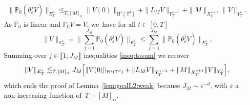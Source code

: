 \documentclass[10pt]{amsart}
\theoremstyle{definition}
\newcommand\T{\mathbb{T}}
\renewcommand\H{\mathrm{H}}
\let\ep\varepsilon
\begin{document}
\begin{align}\label{ineq:tosum}
\| \mathbb{P}_0(\theta_\ep^j V)\|_{E_T^s} \lesssim_{T,[M]_\alpha} \|V(0)\|_{\H^s(\T^d)} + \|L_M V\|_{Y_T^{s-1}} + \|M\|_{X_T^{s+1}}\|V\|_{Y_T^s}.
\end{align}
As $\mathbb{P}_0$ is linear and $\mathbb{P}_0 V = V$, we~have for all $t\in[0,T]$
\[
\|V\|_{E_T^s} = \biggl\|\sum_{j=1}^{J_M} \mathbb{P}_0(\theta_\ep^j V)\biggr\|_{E^s_T} \leq \sum_{j=1}^{J_M} \|\mathbb{P}_0(\theta_\ep^j V)\|_{E_T^s}.
\]
Summing over $j\in\llbracket 1,J_M\rrbracket$ inequalities \eqref{ineq:tosum} we recover
\[
\|V\|_{E_T^s} \lesssim_{T,[M]_\alpha} J_M \Bigl[\|V(0)\|_{\H^s(\T^d)} + \|L_M V\|_{Y_T^{s-1}} + \|M\|_{X_T^{s+1}}\|V\|_{Y_T^s}\Bigr],
\]
which ends the proof of Lemma~\ref{lem:goalL2:weak} because $J_M\sim \ep^{-d}$, with $\ep$ a non-increasing function of~$T+[M]_\alpha$.
\end{document}
